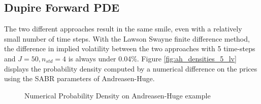 \documentclass[]{rAMF2e}
\begin{document}
\subsection{Dupire Forward PDE}
The two different approaches result in the same smile, even with a relatively small number of time steps. With the Lawson Swayne finite difference method, the difference in implied volatility between the two approaches with 5 time-steps and $J=50, n_{std}=4$ is always under 0.04\%. Figure \ref{fig:ah_densities_5_lv} displays the probability density computed by a numerical difference on the prices using the SABR parameters of Andreasen-Huge.
\begin{figure}[htb]
  \begin{center}  
    \end{center}
     \caption{\label{fig:ah_densities_lv} Numerical Probability Density on Andreasen-Huge example}
\end{figure}
\end{document}
